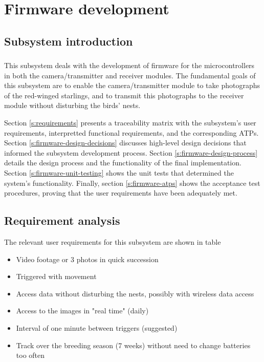 \chapter{Firmware development \label{ch:firmware}}

\section{Subsystem introduction}

\subsection{}

This subsystem deals with the development of firmware for the microcontrollers in both the camera/transmitter and receiver modules. The fundamental goals of this subsystem are to enable the camera/transmitter module to take photographs of the red-winged starlings, and to transmit this photographs to the receiver module without disturbing the birds' nests. 

Section \ref{s:requirements} presents a traceability matrix with the subsystem's user requirements, interpretted functional requirements, and the corresponding ATPs. Section \ref{s:firmware-design-decisions} discusses high-level design decisions that informed the subsystem development process. Section \ref{s:firmware-design-process} details the design process and the functionality of the final implementation. Section \ref{s:firmware-unit-testing} shows the unit tests that determined the system's functionality. Finally, section \ref{s:firmware-atps} shows the acceptance test procedures, proving that the user requirements have been adequately met.

\section{Requirement analysis \label{s:firmware-requirements}}
The relevant user requirements for this subsystem are shown in table


\begin{table}[ht]
    \centering
    
\end{table}

\begin{itemize}
    \item Video footage or 3 photos in quick succession
    \item Triggered with movement
    \item Access data without disturbing the nests, possibly with wireless data access
    \item Access to the images in "real time" (daily)
    \item Interval of one minute between triggers (suggested)
    \item Track over the breeding season (7 weeks) without need to change batteries too often
\end{itemize}


